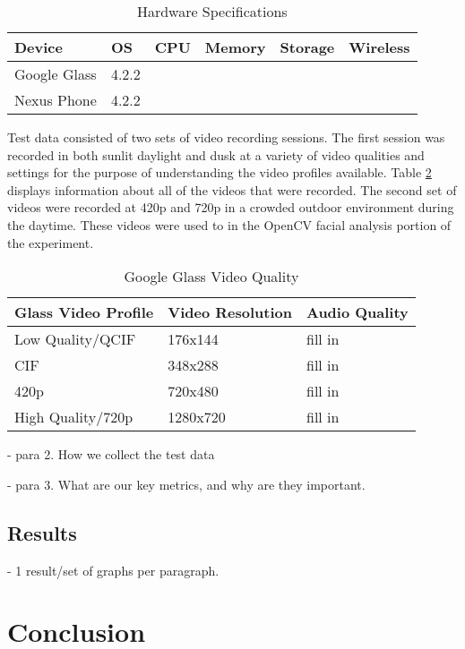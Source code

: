 \documentclass[conference]{IEEEtran}
\begin{document}
\begin{table}[h]
\begin{tabular}{|l|l|l|l|l|l|}
\hline
\textbf{Device} & \textbf{OS} & \textbf{CPU} & \textbf{Memory} & \textbf{Storage} & \textbf{Wireless} \\ \hline
Google Glass    & 4.2.2       &              &                 &                  &                   \\ \hline
Nexus Phone     & 4.2.2       &              &                 &                  &                   \\ \hline
\end{tabular}
\label{table:hardware_specs}
\caption{Hardware Specifications}
\end{table}

Test data consisted of two sets of video recording sessions. The first session was recorded in both sunlit daylight and dusk at a variety of video qualities and settings for the purpose of understanding the video profiles available. Table \ref{table:videoquality} displays information about all of the videos that were recorded. The second set of videos were recorded at 420p and 720p in a crowded outdoor environment during the daytime. These videos were used to in the OpenCV facial analysis portion of the experiment.

\begin{table}[h]
\begin{tabular}{|l|l|l|}
\hline
\textbf{Glass Video Profile} & \textbf{Video Resolution} & \textbf{Audio Quality} \\ \hline
Low Quality/QCIF    & 176x144          & fill in       \\ \hline
CIF                 & 348x288          & fill in       \\ \hline
420p                & 720x480          & fill in       \\ \hline
High Quality/720p   & 1280x720         & fill in       \\ \hline
\end{tabular}
\label{table:videoquality}
\caption{Google Glass Video Quality}
\end{table}

- para 2. How we collect the test data

- para 3. What are our key metrics, and why are they important.

\subsection{Results}

- 1 result/set of graphs per paragraph. 

\section{Conclusion}

{\footnotesize


}
\end{document}

